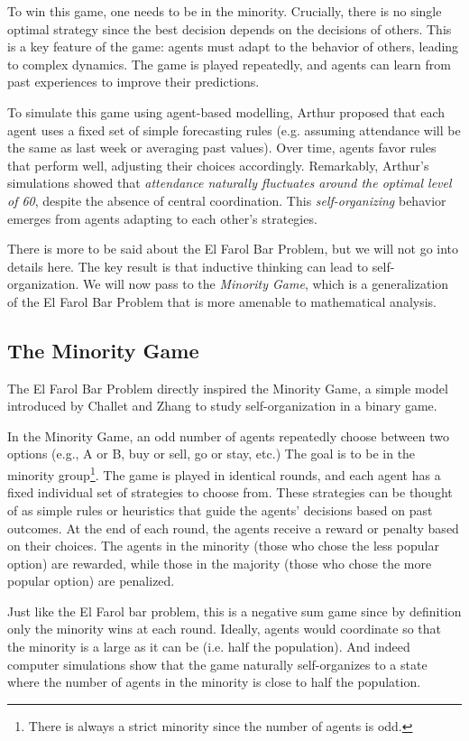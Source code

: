 \documentclass[a4paper, amsfonts, amssymb, amsmath, reprint, showkeys, nofootinbib, twoside]{revtex4-1}
\begin{document}
To win this game, one needs to be in the minority. Crucially, there is no single optimal strategy since the best decision depends on the decisions of others. This is a key feature of the game: agents must adapt to the behavior of others, leading to complex dynamics. The game is played repeatedly, and agents can learn from past experiences to improve their predictions.

To simulate this game using agent-based modelling, Arthur proposed that each agent uses a fixed set of simple forecasting rules (e.g. assuming attendance will be the same as last week or averaging past values). Over time, agents favor rules that perform well, adjusting their choices accordingly. Remarkably, Arthur's simulations showed that \textit{attendance naturally fluctuates around the optimal level of 60}, despite the absence of central coordination. This \textit{self-organizing} behavior emerges from agents adapting to each other’s strategies.

There is more to be said about the El Farol Bar Problem, but we will not go into details here. The key result is that inductive thinking can lead to self-organization. We will now pass to the \textit{Minority Game}, which is a generalization of the El Farol Bar Problem that is more amenable to mathematical analysis.


\subsection{The Minority Game}

The El Farol Bar Problem directly inspired the Minority Game, a simple model introduced by Challet and Zhang \cite{Challet_1997} to study self-organization in a binary game.

In the Minority Game, an odd number of agents repeatedly choose between two options (e.g., A or B, buy or sell, go or stay, etc.) The goal is to be in the minority group\footnote{There is always a strict minority since the number of agents is odd.}. The game is played in identical rounds, and each agent has a fixed individual set of strategies to choose from. These strategies can be thought of as simple rules or heuristics that guide the agents' decisions based on past outcomes. At the end of each round, the agents receive a reward or penalty based on their choices. The agents in the minority (those who chose the less popular option) are rewarded, while those in the majority (those who chose the more popular option) are penalized.

Just like the El Farol bar problem, this is a negative sum game since by definition only the minority wins at each round. Ideally, agents would coordinate so that the minority is a large as it can be (i.e. half the population). And indeed computer simulations show that the game naturally self-organizes to a state where the number of agents in the minority is close to half the population.
\end{document}

